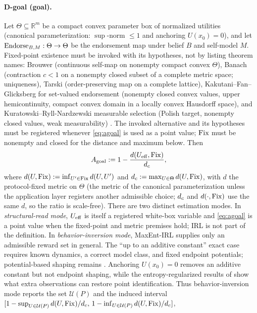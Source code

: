 \paragraph{D-goal (goal).} Let $\Theta\subseteq\mathbb{R}^m$ be a compact
convex parameter box of normalized utilities (canonical parameterization:
$\sup$-norm $\le1$ and anchoring $U(x_0)=0$), and let
$\mathrm{Endorse}_{B,M}:\Theta\to\Theta$ be the endorsement map under belief $B$ and
self-model $M$. Fixed-point existence must be invoked with its hypotheses, not
by listing theorem names: Brouwer (continuous self-map on nonempty compact
convex $\Theta$), Banach (contraction $c<1$ on a nonempty closed subset of a
complete metric space; uniqueness), Tarski (order-preserving map on a complete
lattice), Kakutani--Fan--Glicksberg for set-valued endorsement (nonempty closed
convex values, upper hemicontinuity, compact convex domain in a locally convex
Hausdorff space), and Kuratowski--Ryll-Nardzewski measurable selection (Polish
target, nonempty closed values, weak measurability)
\citep{kuratowski_ryllnardzewski1965}. The invoked alternative and its
hypotheses must be registered whenever \eqref{eq:agoal} is used as a point
value; $\mathrm{Fix}$ must be nonempty and closed for the distance and maximum below. Then
\begin{equation}\label{eq:agoal}
A_{\mathrm{goal}} := 1-\frac{d(U_{\mathrm{eff}},\mathrm{Fix})}{d_{c}},
\end{equation}
where $d(U,\mathrm{Fix}):=\inf_{U'\in\mathrm{Fix}}d(U,U')$ and
$d_{c}:=\max_{U\in\Theta}d(U,\mathrm{Fix})$, with $d$ the protocol-fixed metric on
$\Theta$ (the metric of the canonical parameterization unless the application
layer registers another admissible choice; $d_{c}$ and $d(\cdot,\mathrm{Fix})$ use the
same $d$, so the ratio is scale-free). There are two distinct estimation modes. In \emph{structural-read mode},
$U_{\mathrm{eff}}$ is itself a registered white-box variable and \eqref{eq:agoal} is a
point value when the fixed-point and metric premises hold; IRL is not part of
the definition. In \emph{behavior-inversion mode}, MaxEnt-IRL supplies only an
admissible reward set in general. The ``up to an additive constant'' exact
case requires known dynamics, a correct model class, and fixed endpoint
potentials; potential-based shaping remains \citep{ng1999}. Anchoring
$U(x_0)=0$ removes an additive constant but not endpoint shaping, while the
entropy-regularized results of \citet{cao2021} show what extra observations
can restore point identification. Thus behavior-inversion mode reports the
set $\mathcal U(P)$ and the induced interval
$[1-\sup_{U\in\mathcal U(P)}d(U,\mathrm{Fix})/d_{c},\,
 1-\inf_{U\in\mathcal U(P)}d(U,\mathrm{Fix})/d_{c}]$,
